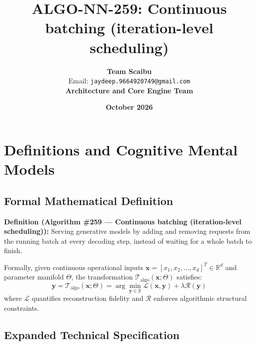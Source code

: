 \documentclass[11pt,a4paper]{article}
\title{\textbf{ALGO-NN-259: Continuous batching (iteration-level scheduling)}}
\author{\textbf{Team Scaibu} \\ \small Email: \texttt{jaydeep.9664920749@gmail.com} \\ \small \textbf{Architecture and Core Engine Team}}
\date{\textbf{October 2026}}
\theoremstyle{definition}
\begin{document}
\maketitle

\section{Definitions and Cognitive Mental Models}

\subsection{Formal Mathematical Definition}
\textbf{Definition (Algorithm \#259 --- Continuous batching (iteration-level scheduling)):}
Serving generative models by adding and removing requests from the running batch at every decoding step, instead of waiting for a whole batch to finish.

Formally, given continuous operational inputs $\mathbf{x} = [x_1, x_2, \dots, x_d]^T \in \mathbb{R}^d$ and parameter manifold $\Theta$, the transformation $\mathcal{T}_{\text{algo}}(\mathbf{x}; \Theta)$ satisfies:
{\boldmath
\begin{equation}
\mathbf{y} = \mathcal{T}_{\text{algo}}(\mathbf{x}; \Theta) = \arg\min_{\mathbf{y} \in \mathcal{Y}} \mathcal{L}(\mathbf{x}, \mathbf{y}) + \lambda \mathcal{R}(\mathbf{y})
\end{equation}
}
where $\mathcal{L}$ quantifies reconstruction fidelity and $\mathcal{R}$ enforces algorithmic structural constraints.

\subsection{Expanded Technical Specification}
\end{document}
